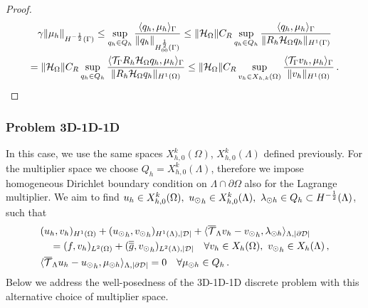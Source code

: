 \documentclass[r]{siamart171218}
\begin{document}
\begin{proof}
\begin{multline*}
\gamma \|\mu_h\|_{H^{-\frac 12}(\Gamma)} 
\leq 
\sup_{q_h \in Q_h} \frac{ \langle q_h, \mu_h \rangle_{\Gamma} } {\|q_h\|_{H^{\frac 12}_{00}(\Gamma)}} 
\leq
\|\mathcal{H}_{\Omega}\| C_R \sup_{q_h \in Q_h} \frac{ \langle q_h, \mu_h \rangle_{\Gamma} } {\|R_h \mathcal{H}_{\Omega} q_h\|_{H^1(\Gamma)}}
\\
=
\|\mathcal{H}_{\Omega}\| C_R \sup_{q_h \in Q_h} \frac{ \langle {\mathcal{T}_\Gamma} R_h  \mathcal{H}_{\Omega}q_h, \mu_h \rangle_{\Gamma} } {\|R_h \mathcal{H}_{\Omega} q_h\|_{H^1(\Omega)}} 
\leq \|\mathcal{H}_{\Omega}\| C_R \sup_{v_h \in X_{h,k}(\Omega)} \frac{ \langle {\mathcal{T}_\Gamma} v_h, \mu_h \rangle_{\Gamma} } {\|v_h\|_{H^1(\Omega)}}\,. 
\end{multline*}
\end{proof}


\subsubsection{Problem 3D-1D-1D}
In this case, we use the same spaces $X_{h,0}^k(\Omega)$, $X_{h,0}^k(\Lambda)$ defined previously.
For the multiplier space we choose $Q_h=X_{h,0}^k(\Lambda)$, therefore we impose homogeneous Dirichlet boundary condition on $\Lambda \cap \partial \Omega$ also for the Lagrange multiplier. 
We aim to find  $u_h \in X_{h,0}^k(\Omega) ,\ {u_{\odot}}_h \in X_{h,0}^k(\Lambda), \ \lambda_{\odot h} \in Q_h \subset H^{-\frac12}(\Lambda)$, such that
\begin{subequations}
\begin{align}\label{eq:prob2_discrete}
&(u_h,v_h)_{H^1(\Omega)} + ({\ud}_h,{\vd}_h)_{H^1(\Lambda), |{\cal D}|} 
+  \langle  \mtrace v_h -  {\vd}_h, \ldh \rangle_{\Lambda, |\DD|} 
\\
\nonumber
&\quad = (f,v_h)_{L^2(\Omega)} + (\avrd{g},{\vd}_h)_{L^2(\Lambda), |{\cal D}|}
\quad \forall v_h \in X_h(\Omega), \ {\vd}_h \in X_h(\Lambda)\,,
\\
& \langle \mtrace u_h - {\ud}_h, \mdh \rangle_{\Lambda,| \DD| } = 0
\quad \forall \mdh \in Q_h\,.
\end{align}
\end{subequations}
Below we address the well-posedness of the 3D-1D-1D discrete problem with this alternative choice of multiplier space.
\end{document}
